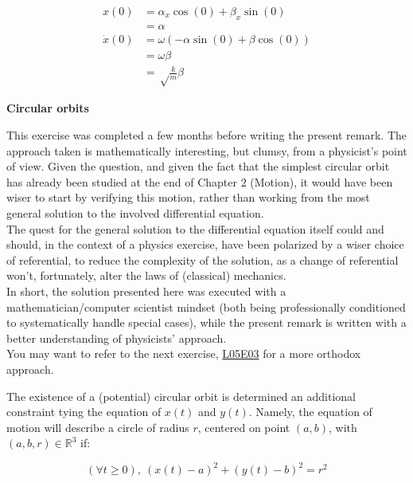 \documentclass[solutions.tex]{subfiles}
\begin{document}
\begin{equation}
	\begin{aligned}
		x(0) &= \alpha_x\cos(0)+\beta_x\sin(0) \\
		~ &= \alpha \\
		\dot{x}(0) &= \omega(-\alpha\sin(0)+\beta\cos(0)) \\
		~ &= \omega\beta \\
		~ &= \sqrt\frac{k}{m}\beta
	\end{aligned}
\end{equation}

\hr
\textbf{Circular orbits}\ \\
\begin{remark} This exercise was completed a few months before
writing the present remark. The approach taken is mathematically
interesting, but clumsy, from a physicist's point of view.
Given the question, and given the fact that the simplest circular
orbit has already been studied at the end of Chapter $2$ (Motion),
it would have been wiser to start by verifying this motion, rather
than working from the most general solution to the involved
differential equation. \\

The quest for the general solution to the differential equation itself
could and should, in the context of a physics exercise, have been
polarized by a wiser choice of referential, to reduce the complexity
of the solution, as a change of referential won't, fortunately, alter
the laws of (classical) mechanics. \\

In short, the solution presented here was executed with a
mathematician/computer scientist mindset (both being professionally
conditioned to systematically handle special cases), while the present
remark is written with a better understanding of physicists' approach. \\

You may want to refer to the next exercise,
\href{https://github.com/mbivert/ttm/blob/master/cm/L05E03.pdf}{L05E03}
for a more orthodox approach.
\end{remark}

The existence of a (potential) circular orbit
is determined an additional constraint tying the equation of $x(t)$ and
$y(t)$. Namely, the equation of motion will describe a circle of radius
$r$, centered on point $(a, b)$, with $(a, b, r)\in\mathbb{R}^3$ if:

\begin{equation}
	\label{eqn:L05E02:circle-constraint}
	(\forall t \geq 0),\ (x(t)-a)^2+(y(t)-b)^2 = r^2
\end{equation}
\end{document}
